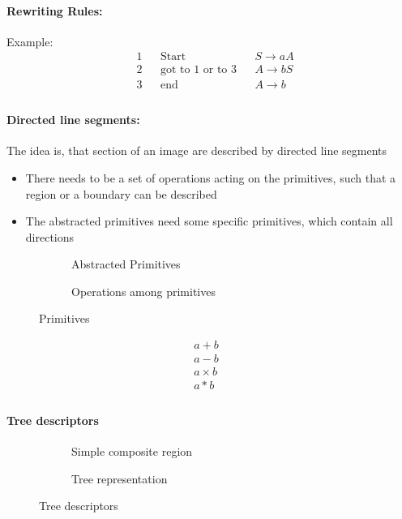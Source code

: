 \paragraph{Rewriting Rules:}
Example:
\begin{align*}
& 1 && \text{Start} && S \rightarrow aA\\
& 2 && \text{got to 1 or to 3} &&  A \rightarrow bS \\
& 3 && \text{end} &&  A \rightarrow b \\
\end{align*}
\paragraph{Directed line segments:} The idea is, that section of an image are described by directed line segments

\begin{itemize}
\item There needs to be a set of
operations acting on the
primitives, such that a region or a
boundary can be described
\item The abstracted primitives need
some specific primitives, which
contain all directions
\end{itemize}
\begin{figure}[h]
	\centering
	\begin{subfigure}[b]{0.45\textwidth}
		\centering
		\caption{Abstracted Primitives}
	\end{subfigure}
	\begin{subfigure}[b]{0.45\textwidth}
		\centering
		\caption{Operations among primitives}
	\end{subfigure}
	\caption{Primitives}
\end{figure}

\begin{align*}
& a+b &&\\
& a-b  &&\\
& a \times b &&\\
& a\ast b &&\\
\end{align*}

\paragraph{Tree descriptors}
\begin{figure}[h]
	\centering
	\begin{subfigure}[b]{0.45\textwidth}
		\centering
		\caption{Simple composite region}
	\end{subfigure}
	\begin{subfigure}[b]{0.45\textwidth}
		\centering
		\caption{Tree representation}
	\end{subfigure}
	\caption{Tree descriptors}
\end{figure}

